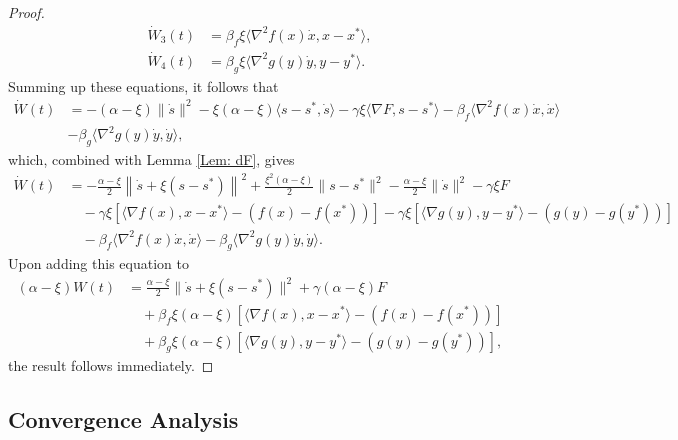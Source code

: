 \documentclass[pdflatex,sn-mathphys-num]{sn-jnl}
\theoremstyle{thmstyleone}
\theoremstyle{thmstyletwo}
\theoremstyle{thmstylethree}
\begin{document}
\begin{proof}
\begin{align*}
\dot{W}_3(t) &= \beta_f \xi \langle \nabla^2 f(x)\dot{x}, x-x^* \rangle,\\
\dot{W}_4(t) &= \beta_g \xi \langle \nabla^2 g(y)\dot{y}, y-y^* \rangle.
\end{align*}
Summing up these equations, it follows that
\begin{align*}
\dot{W}(t) 
&= -(\alpha-\xi) \| \dot{s} \|^2 - \xi(\alpha-\xi)\langle s-s^*, \dot{s} \rangle
  -\gamma\xi \langle \nabla F, s-s^* \rangle
  -\beta_f \langle \nabla^2 f(x)\dot{x}, \dot{x} \rangle \\
& -\beta_g \langle \nabla^2 g(y)\dot{y}, \dot{y} \rangle,
\end{align*}
which, combined with Lemma \ref{Lem: dF}, gives
\begin{align*}
\dot{W}(t)
&= -\frac{\alpha-\xi}{2}\left\| \dot{s} + \xi(s-s^*) \right\|^2
  + \frac{\xi^2(\alpha-\xi)}{2}\| s-s^* \|^2 
  - \frac{\alpha-\xi}{2}\| \dot{s} \|^2 
  - \gamma\xi F \\
&\quad -\gamma\xi [ \langle \nabla f(x), x-x^* \rangle - \left( f(x) - f(x^*) \right) ] 
 -\gamma\xi [ \langle \nabla g(y), y-y^* \rangle - \left( g(y) - g(y^*) \right) ]\\
&\quad -\beta_f \langle \nabla^2 f(x)\dot{x}, \dot{x} \rangle 
  -\beta_g \langle \nabla^2 g(y)\dot{y}, \dot{y} \rangle.   
\end{align*}
Upon adding this equation to
\begin{align*}
(\alpha-\xi)W(t)
&= \frac{\alpha-\xi}{2}\| \dot{s} + \xi(s-s^*) \|^2 + \gamma(\alpha-\xi) F \\
&\quad + \beta_f \xi (\alpha-\xi) [ \langle \nabla f(x), x-x^* \rangle - \left( f(x) - f(x^*) \right) ] \\
&\quad + \beta_g \xi (\alpha-\xi) [ \langle \nabla g(y), y-y^* \rangle - \left( g(y) - g(y^*) \right) ],   
\end{align*}
the result follows immediately.
\end{proof} 




\subsection{Convergence Analysis}
\end{document}
